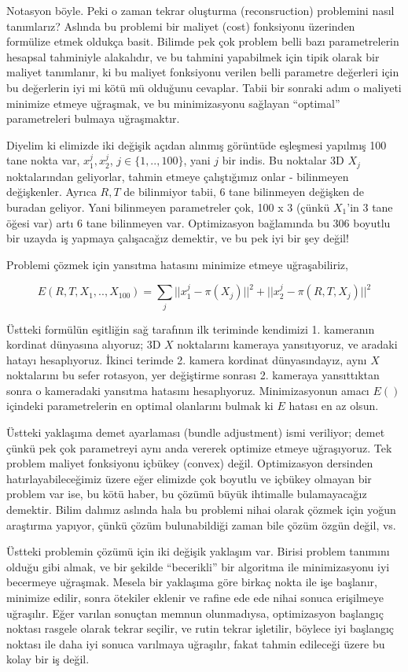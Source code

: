 \documentclass[12pt,fleqn]{article}\usepackage{../../common}
\begin{document}
Notasyon böyle. Peki o zaman tekrar oluşturma (reconsruction) problemini nasıl
tanımlarız? Aslında bu problemi bir maliyet (cost) fonksiyonu üzerinden
formülize etmek oldukça basit. Bilimde pek çok problem belli bazı parametrelerin
hesapsal tahminiyle alakalıdır, ve bu tahmini yapabilmek için tipik olarak bir
maliyet tanımlanır, ki bu maliyet fonksiyonu verilen belli parametre değerleri
için bu değerlerin iyi mi kötü mü olduğunu cevaplar. Tabii bir sonraki adım o
maliyeti minimize etmeye uğraşmak, ve bu minimizasyonu sağlayan ``optimal''
parametreleri bulmaya uğraşmaktır.

Diyelim ki elimizde iki değişik açıdan alınmış görüntüde eşleşmesi yapılmış 100
tane nokta var, $x_1^j,x_2^j$, $j \in \{1,..,100\}$, yani $j$ bir indis. Bu
noktalar 3D $X_j$ noktalarından geliyorlar, tahmin etmeye çalıştığımız onlar -
bilinmeyen değişkenler. Ayrıca $R,T$ de bilinmiyor tabii, 6 tane bilinmeyen
değişken de buradan geliyor. Yani bilinmeyen parametreler çok, 100 x 3 (çünkü
$X_1$'in 3 tane öğesi var) artı 6 tane bilinmeyen var. Optimizasyon bağlamında
bu 306 boyutlu bir uzayda iş yapmaya çalışacağız demektir, ve bu pek iyi bir şey
değil!

Problemi çözmek için yansıtma hatasını minimize etmeye uğraşabiliriz, 

$$ E(R,T,X_1,..,X_{100}) = 
\sum_{j} || x_1^j - \pi(X_j)||^2 + || x_2^j - \pi(R,T,X_j)||^2
$$

Üstteki formülün eşitliğin sağ tarafının ilk teriminde kendimizi 1. kameranın
kordinat dünyasına alıyoruz; 3D $X$ noktalarını kameraya yansıtıyoruz, ve
aradaki hatayı hesaplıyoruz. İkinci terimde 2. kamera kordinat dünyasındayız,
aynı $X$ noktalarını bu sefer rotasyon, yer değiştirme sonrası 2. kameraya
yansıttıktan sonra o kameradaki yansıtma hatasını hesaplıyoruz. Minimizasyonun
amacı $E()$ içindeki parametrelerin en optimal olanlarını bulmak ki $E$ hatası
en az olsun.

Üstteki yaklaşıma demet ayarlaması (bundle adjustment) ismi veriliyor; demet
çünkü pek çok parametreyi aynı anda vererek optimize etmeye uğraşıyoruz. Tek
problem maliyet fonksiyonu içbükey (convex) değil. Optimizasyon dersinden
hatırlayabileceğimiz üzere eğer elimizde çok boyutlu ve içbükey olmayan bir
problem var ise, bu kötü haber, bu çözümü büyük ihtimalle bulamayacağız
demektir. Bilim dalımız aslında hala bu problemi nihai olarak çözmek için yoğun
araştırma yapıyor, çünkü çözüm bulunabildiği zaman bile çözüm özgün değil, vs.

Üstteki problemin çözümü için iki değişik yaklaşım var. Birisi problem tanımını
olduğu gibi almak, ve bir şekilde ``becerikli'' bir algoritma ile minimizasyonu
iyi becermeye uğraşmak. Mesela bir yaklaşıma göre birkaç nokta ile işe başlanır,
minimize edilir, sonra ötekiler eklenir ve rafine ede ede nihai sonuca
erişilmeye uğraşılır. Eğer varılan sonuçtan memnun olunmadıysa, optimizasyon
başlangıç noktası rasgele olarak tekrar seçilir, ve rutin tekrar işletilir,
böylece iyi başlangıç noktası ile daha iyi sonuca varılmaya uğraşılır, fakat
tahmin edileceği üzere bu kolay bir iş değil.
\end{document}
